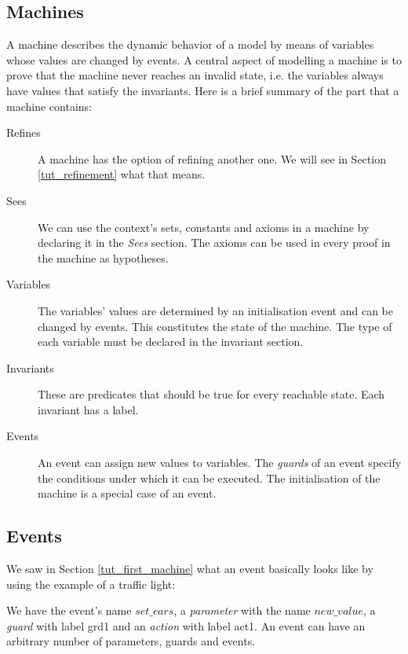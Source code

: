 \subsection{Machines}
\label{tut_machines}

A machine describes the dynamic behavior of a model by means of
variables whose values are changed by events.
A central aspect of modelling a machine is to prove that the machine
never reaches an invalid state, i.e. the variables always have values
that satisfy the invariants.
Here is a brief summary of the part that a machine contains:

\begin{description}
\item[Refines]  A machine has the option of refining another one.
  We will see in Section \ref{tut_refinement} what that means.
\item[Sees]  We can use the context's sets, constants and axioms  in
  a machine by declaring it in the \textsl{Sees} section.
  The axioms can be used in every proof in the machine as hypotheses.
\item[Variables] 
  The variables' values are determined by an initialisation event and
  can be changed by events. This constitutes the state of the machine. The type of each variable must be declared in the invariant section.
\item[Invariants] 
  These are predicates that should be true for every reachable state.
  Each invariant has a label.
\item[Events] 
  An event can assign new values to variables.
  The \emph{guards} of an event specify the conditions under which it can be executed.
  The initialisation of the machine is a special case of an event.
\end{description}

\subsection{Events}
\label{tut_events}

We saw in Section \ref{tut_first_machine} what an event basically looks like by using the example of a traffic light:
\begin{description}
		\begin{description}
		\AnyPrm
			\begin{description}
			\end{description}
		\WhereGrd
			\begin{description}
			\nItemX{ grd1 }{ new\_value \in  BOOL }
			\end{description}
		\ThenAct
			\begin{description}
			\nItemX{ act1 }{ cars\_go :=  new\_value }
			\end{description}
		\EndAct
		\end{description}
\end{description}
We have the event's name $set\_cars$, a \emph{parameter} with the name $new\_value$,
a \emph{guard} with label grd1 and an \emph{action} with label act1.
An event can have an arbitrary number of parameters, guards and events.

